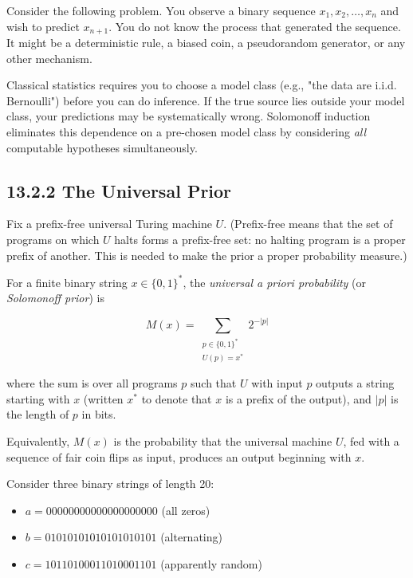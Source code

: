 Consider the following problem. You observe a binary sequence $x_1, x_2, \ldots, x_n$ and wish to predict $x_{n+1}$. You do not know the process that generated the sequence. It might be a deterministic rule, a biased coin, a pseudorandom generator, or any other mechanism.

Classical statistics requires you to choose a model class (e.g., "the data are i.i.d. Bernoulli") before you can do inference. If the true source lies outside your model class, your predictions may be systematically wrong. Solomonoff induction eliminates this dependence on a pre-chosen model class by considering \textit{all} computable hypotheses simultaneously.

\subsection{13.2.2 The Universal Prior}

Fix a prefix-free universal Turing machine $U$. (Prefix-free means that the set of programs on which $U$ halts forms a prefix-free set: no halting program is a proper prefix of another. This is needed to make the prior a proper probability measure.)

\begin{definition}
For a finite binary string $x \in \{ 0,1\} ^*$, the \textit{universal a priori probability} (or \textit{Solomonoff prior}) is

\[
M(x) = \sum_{\substack{p \in \{ 0,1\} ^* \\ U(p) = x^*}} 2^{-|p|}
\]

where the sum is over all programs $p$ such that $U$ with input $p$ outputs a string starting with $x$ (written $x^*$ to denote that $x$ is a prefix of the output), and $|p|$ is the length of $p$ in bits.

Equivalently, $M(x)$ is the probability that the universal machine $U$, fed with a sequence of fair coin flips as input, produces an output beginning with $x$.
\end{definition}

\begin{example}
Consider three binary strings of length 20:
\end{example}
\begin{itemize}
  \item $a = 00000000000000000000$ (all zeros)
  \item $b = 01010101010101010101$ (alternating)
  \item $c = 10110100011010001101$ (apparently random)
\end{itemize}

